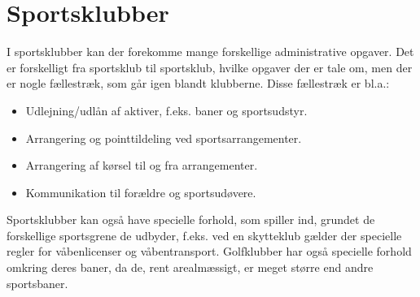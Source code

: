 \section{Sportsklubber} \label{Sportsklubber}

I sportsklubber kan der forekomme mange forskellige administrative opgaver. 
Det er forskelligt fra sportsklub til sportsklub, hvilke opgaver der er tale om, men der er nogle fællestræk, som går igen blandt klubberne. 
Disse fællestræk er bl.a.:
\begin{itemize}
	\item Udlejning/udlån af aktiver, f.eks. baner og sportsudstyr. 
	\item Arrangering og pointtildeling ved sportsarrangementer.
	\item Arrangering af kørsel til og fra arrangementer.
	\item Kommunikation til forældre og sportsudøvere.
\end{itemize}

Sportsklubber kan også have specielle forhold, som spiller ind, grundet de forskellige sportsgrene de udbyder, f.eks. ved en skytteklub gælder der specielle regler for våbenlicenser og våbentransport.
Golfklubber har også specielle forhold omkring deres baner, da de, rent arealmæssigt, er meget større end andre sportsbaner. 





